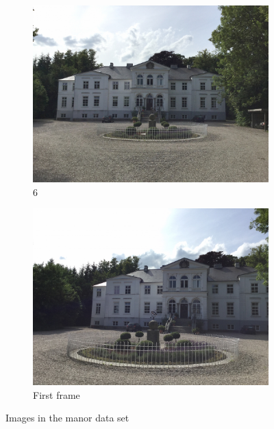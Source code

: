 \begin{figure}[h]
   \begin{subfigure}{.33\textwidth}
      \includegraphics[width=\textwidth]{gfx/manor_imgs/9.JPG}
      \caption{$6$}
   \end{subfigure}
   \begin{subfigure}{.33\textwidth}
      \includegraphics[width=\textwidth]{gfx/manor_imgs/first_frame_centered.JPG}
      \caption{First frame}
   \end{subfigure}
   \caption[Manor images]{Images in the manor data set}
   \label{fig:manor_imgs}
\end{figure}
\FloatBarrier

